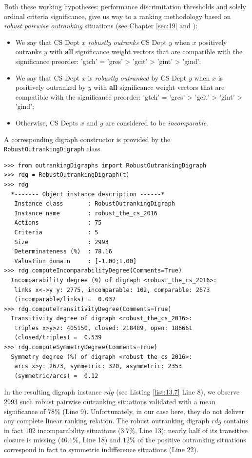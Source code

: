 Both these working hypotheses: performance discrimitation thresholds and solely ordinal criteria significance, give us way to a ranking methodology based on \emph{robust pairwise outranking} situations (see Chapter \ref{sec:19} and \citep{BIS-2004b}):
\begin{itemize}
\item We say that CS Dept $x$ \emph{robustly outranks} CS Dept $y$ when $x$ positively outranks $y$ with \textbf{all} significance weight vectors that are compatible with the significance preorder: 'gtch' = 'gres' > 'gcit' > 'gint' > 'gind';
\item We say that CS Dept $x$ is \emph{robustly outranked} by CS Dept $y$ when $x$ is positively outranked by $y$ with \textbf{all} significance weight vectors that are compatible with the significance preorder: 'gtch' = 'gres' > 'gcit' > 'gint' > 'gind';
\item Otherwise, CS Depts $x$ and $y$ are considered to be \emph{incomparable}.
\end{itemize}

A corresponding digraph constructor is provided by the \texttt{RobustOutrankingDigraph} class.

\begin{lstlisting}[caption={Computing the robust outranking digraph},label=list:13.7]
>>> from outrankingDigraphs import RobustOutrankingDigraph		     
>>> rdg = RobustOutrankingDigraph(t)
>>> rdg
  *------- Object instance description ------*
   Instance class       : RobustOutrankingDigraph
   Instance name        : robust_the_cs_2016
   Actions              : 75
   Criteria             : 5
   Size                 : 2993
   Determinateness (%)  : 78.16
   Valuation domain     : [-1.00;1.00]
>>> rdg.computeIncomparabilityDegree(Comments=True)
  Incomparability degree (%) of digraph <robust_the_cs_2016>:
   links x<->y y: 2775, incomparable: 102, comparable: 2673
   (incomparable/links) =  0.037
>>> rdg.computeTransitivityDegree(Comments=True)
  Transitivity degree of digraph <robust_the_cs_2016>:
   triples x>y>z: 405150, closed: 218489, open: 186661
   (closed/triples) =  0.539
>>> rdg.computeSymmetryDegree(Comments=True)
  Symmetry degree (%) of digraph <robust_the_cs_2016>:
   arcs x>y: 2673, symmetric: 320, asymmetric: 2353
   (symmetric/arcs) =  0.12
\end{lstlisting}

In the resulting digraph instance $rdg$ (see Listing \ref{list:13.7} Line 8), we observe 2993 such robust pairwise outranking situations validated with a mean significance of $78\%$ (Line 9). Unfortunately, in our case here, they do not deliver any complete linear ranking relation. The robust outranking digraph $rdg$ contains in fact 102 incomparability situations ($3.7\%$, Line 13); nearly half of its transitive closure is missing ($46.1\%$, Line 18) and $12\%$ of the positive outranking situations correspond in fact to symmetric indifference situations (Line 22).

